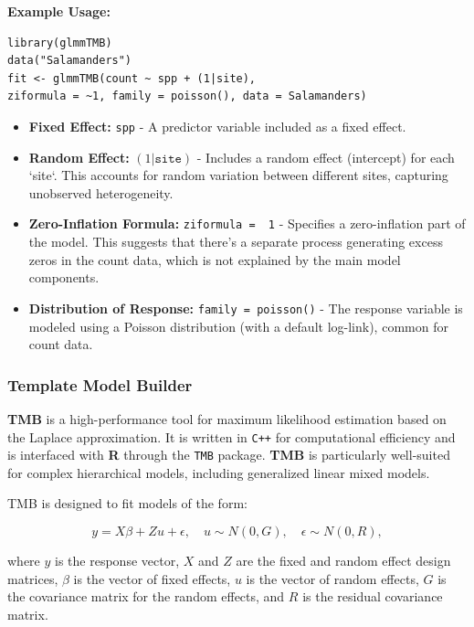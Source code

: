 \documentclass[12pt, twoside,hidelinks]{article}
\theoremstyle{definition}
\numberwithin{equation}{section}
\begin{document}
\textbf{Example Usage:}
\begin{verbatim}
library(glmmTMB)
data("Salamanders")
fit <- glmmTMB(count ~ spp + (1|site),
ziformula = ~1, family = poisson(), data = Salamanders)
\end{verbatim}

\begin{itemize}
    \item \textbf{Fixed Effect:} \texttt{spp} - A predictor variable included as a fixed effect.
    
    \item \textbf{Random Effect:} $(1|\texttt{site})$ - Includes a random effect (intercept) for each `site`. This accounts for random variation between different sites, capturing unobserved heterogeneity.
    
    \item \textbf{Zero-Inflation Formula:} \texttt{ziformula = ~1} - Specifies a zero-inflation part of the model. This suggests that there's a separate process generating excess zeros in the count data, which is not explained by the main model components.
    
    \item \textbf{Distribution of Response:} \texttt{family = poisson()} - The response variable is modeled using a Poisson distribution (with a default log-link), common for count data.
\end{itemize}

\subsubsection{Template Model Builder}

\textbf{TMB} is a high-performance tool for maximum likelihood estimation based on the Laplace approximation. It is written in \texttt{C++} for computational efficiency and is interfaced with \textbf{R} through the \texttt{TMB} package. \textbf{TMB} is particularly well-suited for complex hierarchical models, including generalized linear mixed models.
\newline

TMB is designed to fit models of the form:

\begin{equation}
    y = X\beta + Z u + \epsilon, \quad u \sim N(0,G), \quad \epsilon \sim N(0, R),
\label{eq:glmmtmb}
\end{equation}

where \(y\) is the response vector, \(X\) and \(Z\) are the fixed and random effect design matrices, \(\beta\) is the vector of fixed effects, \(u\) is the vector of random effects, \(G\) is the covariance matrix for the random effects, and \(R\) is the residual covariance matrix.
\newline
\end{document}
